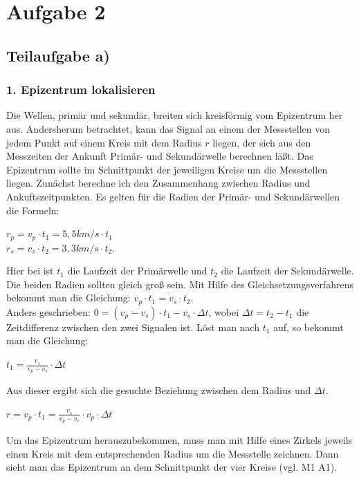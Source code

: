 \documentclass{article}
\begin{document}
\section*{Aufgabe 2}
\subsection*{Teilaufgabe a)}
\subsubsection*{1. Epizentrum lokalisieren}
Die Wellen, primär und sekundär, breiten sich kreisförmig vom Epizentrum her aus. Andersherum betrachtet, kann das Signal an einem der Messstellen von jedem Punkt auf einem Kreis mit dem Radius $r$ liegen, 
der sich aus den Messzeiten der Ankunft Primär- und Sekundärwelle berechnen läßt. 
Das Epizentrum sollte im Schnittpunkt der jeweiligen Kreise um die Messstellen liegen. 
Zunächst berechne ich den Zusammenhang zwischen Radius und Ankuftszeitpunkten. 
Es gelten für die Radien der Primär- und Sekundärwellen die Formeln: 
\begin{center}
	$r_{p} = v_p \cdot t_1 = 5,5 km/s \cdot t_1$ \\ 
	$r_{s} = v_s \cdot t_2 = 3,3 km/s \cdot t_2$.
\end{center}
Hier bei ist $t_1$ die Laufzeit der Primärwelle und $t_2$ die Laufzeit der Sekundärwelle.\\
Die beiden Radien sollten gleich groß sein. Mit Hilfe des Gleichsetzungsverfahrens bekommt man die Gleichung: 
\space \space $v_p \cdot t_1  = v_s \cdot t_2$.\\
Anders geschrieben: $0 = (v_p-v_s) \cdot t_1  - v_s \cdot \Delta t$, 
wobei $\Delta t = t_2- t_1$ die Zeitdifferenz zwischen den zwei Signalen ist. 
Löst man nach $t_1$ auf, so bekommt man die Gleichung:
\begin{center}
	\item $t_1 = \frac{v_s }{v_p - v_s}\cdot \Delta t$ 
\end{center}
Aus dieser ergibt sich die gesuchte Beziehung zwischen dem Radius und $\Delta t$. 
\begin{center}
	\item $r = v_p \cdot t_1 = \frac{v_s}{v_p - v_s} \cdot v_p \cdot \Delta t$
\end{center}
Um das Epizentrum herauszubekommen, muss man mit Hilfe eines Zirkels jeweils einen Kreis mit dem entsprechenden Radius um die Messstelle zeichnen. 
Dann sieht man das Epizentrum an dem Schnittpunkt der vier Kreise (vgl. M1 A1). 
\end{document}
